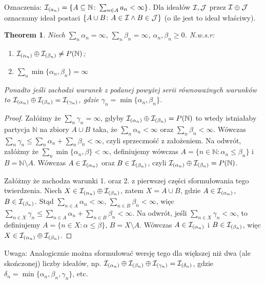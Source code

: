 \documentclass[12pt]{article}
\theoremstyle{plain}
\newtheorem{theorem}{Theorem}[section]
\theoremstyle{definition}
\theoremstyle{remark}
\newcommand{\nnatural}{\mathbb{N}}
\newcommand{\cI}{{\cal I}}
\newcommand{\cJ}{{\cal J}}
\begin{document}
Oznaczenia:
  $\cI_{(a_n)} = \{ A \subseteq \nnatural\colon \sum_{n\in A} a_n < \infty\}$.
Dla ideałów $\cI, \cJ$ przez $\cI \oplus \cJ$ oznaczamy ideał
postaci $\{A \cup B\colon A \in \cI \wedge B \in \cJ\}$ (o ile jest
to ideał właściwy).

\begin{theorem}
Niech $\sum_n \alpha_n = \infty$, $\sum_n \beta_n = \infty$,
$\alpha_n, \beta_n \geq 0$. N.w.s.r:
\begin{enumerate}
\item
  $\cI_{(\alpha_n)} \oplus \cI_{(\beta_n)} \not = P(\nnatural)$;
\item
  $\sum_n \min\{\alpha_n,\beta_n\} = \infty$
\end{enumerate}
Ponadto jeśli zachodzi warunek z podanej powyżej serii równoważnych warunków
to $\cI_{(\alpha_n)} \oplus \cI_{(\beta_n)} = \cI_{(\gamma_n)}$,
gdzie $\gamma_n = \min\{\alpha_n,\beta_n\}$.
\end{theorem}
\begin{proof}
Załóżmy że $\sum_n \gamma_n = \infty$, gdyby 
$\cI_{(\alpha_n)} \oplus \cI_{(\beta_n)} = P(\nnatural)$ to wtedy
istniałaby partycja $\nnatural$ na zbiory $A \cup B$ taka, że 
$\sum_n \alpha_n < \infty$ oraz $\sum_n \beta_n < \infty$.
Wówczas $\sum_n \gamma_n \leq \sum_n \alpha_n + \sum_n \beta_n < \infty$,
czyli sprzeczność z założeniem. 
Na odwrót, załóżmy że $\sum_n \min\{\alpha_n,\beta\} < \infty$,
definiujemy wówczas $A = \{n \in \nnatural \colon \alpha_n \leq \beta_n\}$
i $B = \nnatural \setminus A$. Wówczas 
$A \in \cI_{(\alpha_n)}$ oraz $B \in \cI_{(\beta_n)}$, czyli 
$\cI_{(\alpha_n)} \oplus \cI_{(\beta_n)} = P(\nnatural)$.
  
Załóżmy że zachodza warunki 1. oraz 2. z pierwszej części 
sformułowania tego twierdzenia. Niech 
$X \in \cI_{(\alpha_n)} \oplus \cI_{(\beta_n)}$, zatem
$X = A \cup B$, gdzie $A \in \cI_{(\alpha_n)}$,
$B \in \cI_{(\beta_n)}$. Stąd $\sum_{n\in A} \alpha_n < \infty$, 
$\sum_{n\in B} \beta_n < \infty$, więc 
$\sum_{n\in X} \gamma_n \leq \sum_{n\in A} \alpha_n + \sum_{n\in B} \beta_n < \infty$.
Na odwrót, jeśli $\sum_{n\in X} \gamma_n < \infty$, to 
definiujemy $A = \{n\in X\colon \alpha \leq \beta \}$,
$B = X \setminus A$. Wówczas $A \in \cI_{(\alpha_n)}$ i
$B \in \cI_{(\beta_n)}$, więc 
$X\in\cI_{(\alpha_n)} \oplus \cI_{(\beta_n)}$.
\end{proof}

Uwaga: Analogicznie można sformułować wersję tego dla większej
niż dwa (ale skończonej) liczby ideałów, np. 
$\cI_{(\alpha_n)} \oplus \cI_{(\beta_n)} \oplus \cI_{(\gamma_n)} = \cI_{(\delta_n)}$,
gdzie $\delta_n = \min\{\alpha_n,\beta_n, \gamma_n\}$, etc.
\end{document}

